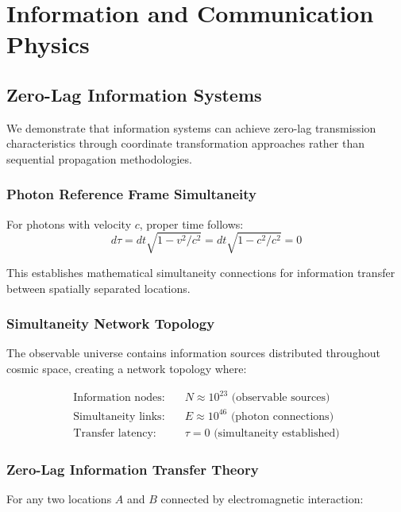 \documentclass[12pt,a4paper]{article}
\theoremstyle{remark}
\begin{document}
\section{Information and Communication Physics}

\subsection{Zero-Lag Information Systems}

We demonstrate that information systems can achieve zero-lag transmission characteristics through coordinate transformation approaches rather than sequential propagation methodologies.

\subsubsection{Photon Reference Frame Simultaneity}

For photons with velocity $c$, proper time follows:
\begin{equation}
d\tau = dt\sqrt{1-v^2/c^2} = dt\sqrt{1-c^2/c^2} = 0
\end{equation}

This establishes mathematical simultaneity connections for information transfer between spatially separated locations.

\subsubsection{Simultaneity Network Topology}

The observable universe contains information sources distributed throughout cosmic space, creating a network topology where:

\begin{align}
\text{Information nodes:} &\quad N \approx 10^{23} \text{ (observable sources)} \\
\text{Simultaneity links:} &\quad E \approx 10^{46} \text{ (photon connections)} \\
\text{Transfer latency:} &\quad \tau = 0 \text{ (simultaneity established)}
\end{align}

\subsubsection{Zero-Lag Information Transfer Theory}

For any two locations $A$ and $B$ connected by electromagnetic interaction:
\end{document}
